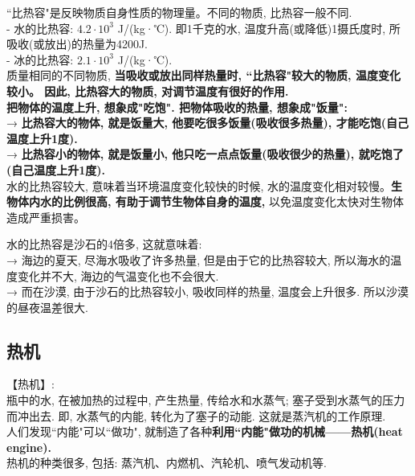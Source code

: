 \documentclass[UTF8]{ctexart}
\begin{document}
``比热容"是反映物质自身性质的物理量。不同的物质, 比热容一般不同. \\

- 水的比热容: $4.2 \cdot 10^3$  J/(kg·℃). 即1千克的水, 温度升高(或降低)1摄氏度时, 所吸收(或放出)的热量为4200J. \\
- 冰的比热容: $2.1 \cdot 10^3$  J/(kg·℃).  \\

质量相同的不同物质, \textbf{当吸收或放出同样热量时, ``比热容"较大的物质, 温度变化较小。 因此, 比热容大的物质, 对调节温度有很好的作用.} \\


\textbf{把物体的温度上升, 想象成"吃饱". 把物体吸收的热量, 想象成"饭量":} \\
→ \textbf{比热容大的物体, 就是饭量大, 他要吃很多饭量(吸收很多热量), 才能吃饱(自己温度上升1度).}  \\
→ \textbf{比热容小的物体, 就是饭量小, 他只吃一点点饭量(吸收很少的热量), 就吃饱了(自己温度上升1度).}  \\


水的比热容较大, 意味着当环境温度变化较快的时候, 水的温度变化相对较慢。\textbf{生物体内水的比例很高, 有助于调节生物体自身的温度, }以免温度变化太快对生物体造成严重损害。 \\


\begin{tcolorbox}[title = {例},boxrule={0.1em},colframe={black!10}, colback={black!3},colbacktitle={black!10},coltitle={black}]
水的比热容是沙石的4倍多, 这就意味着: \\
→ 海边的夏天, 尽海水吸收了许多热量, 但是由于它的比热容较大, 所以海水的温度变化并不大, 海边的气温变化也不会很大. \\
→ 而在沙漠, 由于沙石的比热容较小, 吸收同样的热量, 温度会上升很多. 所以沙漠的昼夜温差很大. 
\end{tcolorbox}


\vspace{1em} 


	
	\subsection{热机}
	
	【热机】: \\
	瓶中的水, 在被加热的过程中, 产生热量, 传给水和水蒸气; 塞子受到水蒸气的压力而冲出去. 即, 水蒸气的内能, 转化为了塞子的动能. 这就是蒸汽机的工作原理. \\	
	
	人们发现``内能"可以``做功", 就制造了各种\textbf{利用``内能"做功的机械——热机(heat engine).} \\	
	热机的种类很多, 包括: 蒸汽机、内燃机、汽轮机、喷气发动机等. \\
	
\end{document}
